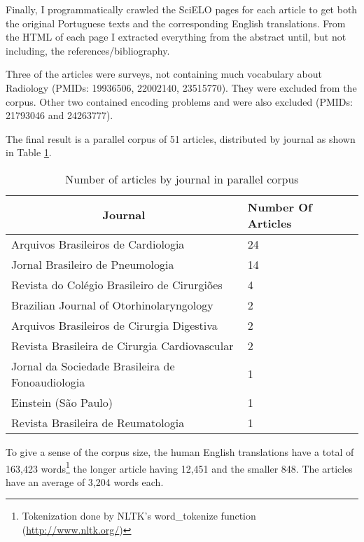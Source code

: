 Finally, I programmatically crawled the SciELO pages for each article to get both the original Portuguese texts and the corresponding English translations. From the HTML of each page I extracted everything from the abstract until, but not including, the references/bibliography.

Three of the articles were surveys, not containing much vocabulary about Radiology (PMIDs: 19936506, 22002140, 23515770). They were excluded from the corpus. Other two contained encoding problems and were also excluded (PMIDs: 21793046 and 24263777).

The final result is a parallel corpus of 51 articles, distributed by journal as shown in Table \ref{table:articles_by_journal}.

\begin{table}[ht]
\centering
\caption{Number of articles by journal in parallel corpus}
\label{table:articles_by_journal}
\begin{tabular}{@{}ll@{}}
\toprule
\multicolumn{1}{c}{\textbf{Journal}}                 & \textbf{Number Of Articles} \\ \midrule
Arquivos Brasileiros de Cardiologia         & 24                          \\
Jornal Brasileiro de Pneumologia            & 14                          \\
Revista do Colégio Brasileiro de Cirurgiões & 4                           \\
Brazilian Journal of Otorhinolaryngology    & 2                           \\
Arquivos Brasileiros de Cirurgia Digestiva  & 2                           \\
Revista Brasileira de Cirurgia Cardiovascular        & 2                           \\
Jornal da Sociedade Brasileira de Fonoaudiologia     & 1                           \\
Einstein (São Paulo)                                 & 1                           \\
Revista Brasileira de Reumatologia                   & 1                           \\ \bottomrule
\end{tabular}
\end{table}

To give a sense of the corpus size, the human English translations have a total of 163,423 words\footnote{Tokenization done by NLTK's word\_tokenize function (\url{http://www.nltk.org/})} the longer article having 12,451 and the smaller 848. The articles have an average of 3,204 words each. 

